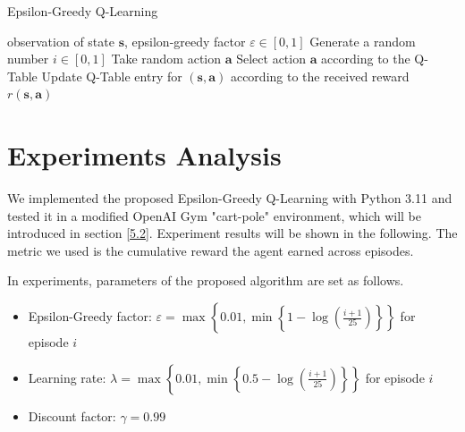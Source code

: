 \documentclass[10pt,a4paper]{article}
\begin{document}
	\begin{algorithm}
		\caption{Epsilon-Greedy Q-Learning}\label{alg:egql}
		\begin{algorithmic}
			\Require observation of state $\boldsymbol{s}$, epsilon-greedy factor $\varepsilon \in [0,1]$
			\State Generate a random number $i \in [0,1]$
			\State Take random action $\boldsymbol{a}$
			\Else
			\State Select action $\boldsymbol{a}$ according to the Q-Table 
			\EndIf
			\State Update Q-Table entry for $(\boldsymbol{s}, \boldsymbol{a})$ according to the received reward $r(\boldsymbol{s}, \boldsymbol{a})$ 
			\EndWhile
		\end{algorithmic}
	\end{algorithm}
	
	\section{Experiments Analysis}
	We implemented the proposed Epsilon-Greedy Q-Learning with Python 3.11 and tested it in a modified OpenAI Gym "cart-pole" environment, which will be introduced in section \ref{5.2}. Experiment results will be shown in the following. The metric we used is the cumulative reward the agent earned across episodes. 
	
	In experiments, parameters of the proposed algorithm are set as follows. 
	\begin{itemize}
		\item Epsilon-Greedy factor: $\varepsilon = \max\left\{0.01, \min\left\{1-\log\left(\frac{i+1}{25}\right)\right\}\right\}$ for episode $i$
		\item Learning rate: $\lambda = \max\left\{0.01, \min\left\{0.5-\log\left(\frac{i+1}{25}\right)\right\}\right\}$ for episode $i$
		\item Discount factor: $\gamma = 0.99$ 
	\end{itemize}
	
\end{document}
